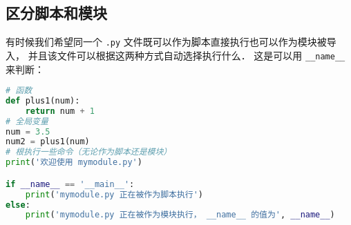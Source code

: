 
\subsection{区分脚本和模块}
有时候我们希望同一个 \verb|.py| 文件既可以作为脚本直接执行也可以作为模块被导入， 并且该文件可以根据这两种方式自动选择执行什么． 这是可以用 \verb|__name__| 来判断：
\begin{lstlisting}[language=mymodule2.py]
# 函数
def plus1(num):
    return num + 1
# 全局变量
num = 3.5
num2 = plus1(num)
# 根执行一些命令（无论作为脚本还是模块）
print('欢迎使用 mymodule.py')

if __name__ == '__main__':
    print('mymodule.py 正在被作为脚本执行')
else:
    print('mymodule.py 正在被作为模块执行， __name__ 的值为', __name__)
\end{lstlisting}
